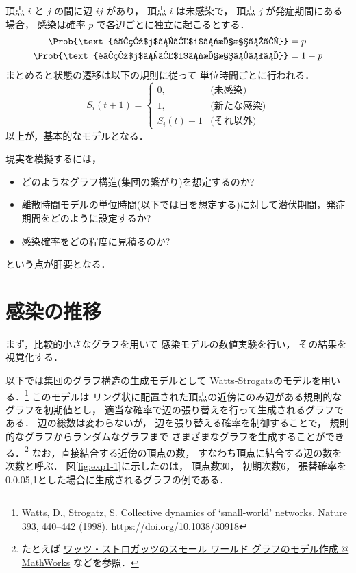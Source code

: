 \documentclass[10pt,oneside]{scrartcl}
\begin{document}
頂点 \(i\) と \(j\) の間に辺 \(ij\) があり，
頂点 \(i\) は未感染で，
頂点 \(j\) が発症期間にある場合，
感染は確率 \(p\) で各辺ごとに独立に起こるとする．
\begin{align}
  \Prob{\text{頂点$j$から$i$に感染する}} &=p\\
  \Prob{\text{頂点$j$から$i$に感染しない}}&=1-p
\end{align}
まとめると状態の遷移は以下の規則に従って
単位時間ごとに行われる．
\begin{equation}
  S_{i}(t{+}1)
  =
  \begin{cases}
    0,&\text{(未感染)}\\
    1,&\text{(新たな感染)}\\
    S_{i}(t)+1&\text{(それ以外)}
  \end{cases}
\end{equation}
以上が，基本的なモデルとなる．

現実を模擬するには，
\begin{itemize}
\item どのようなグラフ構造(集団の繋がり)を想定するのか?
\item 離散時間モデルの単位時間(以下では日を想定する)に対して潜伏期間，発症期間をどのように設定するか?
\item 感染確率をどの程度に見積るのか?
\end{itemize}
という点が肝要となる．

\section{感染の推移}
\label{sec:org8a63514}

まず，比較的小さなグラフを用いて
感染モデルの数値実験を行い，
その結果を視覚化する．

\begin{figure*}%
  \centering
\end{figure*}

以下では集団のグラフ構造の生成モデルとして
Watts-Strogatzのモデルを用いる．\footnote{Watts, D., Strogatz, S. Collective dynamics of ‘small-world’ networks. Nature 393, 440–442 (1998). \url{https://doi.org/10.1038/30918}}
このモデルは
リング状に配置された頂点の近傍にのみ辺がある規則的なグラフを初期値とし，
適当な確率で辺の張り替えを行って生成されるグラフである．
辺の総数は変わらないが，
辺を張り替える確率を制御することで，
規則的なグラフからランダムなグラフまで
さまざまなグラフを生成することができる．\footnote{たとえば \href{https://jp.mathworks.com/help/matlab/math/build-watts-strogatz-small-world-graph-model.html}{ワッツ・ストロガッツのスモール ワールド グラフのモデル作成 @ MathWorks} 
などを参照．}
なお，直接結合する近傍の頂点の数，
すなわち頂点に結合する辺の数を次数と呼ぶ．
図\ref{fig:exp1-1}に示したのは，
頂点数30，
初期次数6，
張替確率を0,0.05,1とした場合に生成されるグラフの例である．
\end{document}
